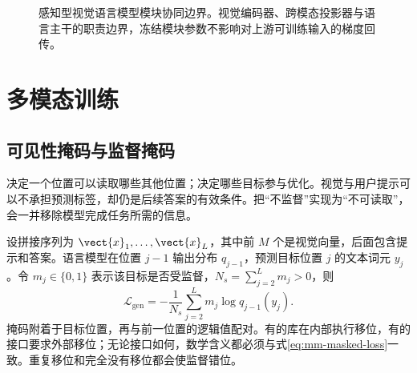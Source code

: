 \documentclass[../textbook.tex]{subfiles}
\begin{document}
\begin{figure}[htbp]
\centering
{}
\caption[感知型视觉语言模型模块协同边界]{感知型视觉语言模型模块协同边界。视觉编码器、跨模态投影器与语言主干的职责边界，冻结模块参数不影响对上游可训练输入的梯度回传。}\label{fig:mm-architecture}
\end{figure}


\section{多模态训练}

\subsection{可见性掩码与监督掩码}
决定一个位置可以读取哪些其他位置；决定哪些目标参与优化。视觉与用户提示可以不承担预测标签，却仍是后续答案的有效条件。把“不监督”实现为“不可读取”，会一并移除模型完成任务所需的信息。

设拼接序列为 $\vect{x}_1,\ldots,\vect{x}_L$，其中前 $M$ 个是视觉向量，后面包含提示和答案。语言模型在位置 $j-1$ 输出分布 $q_{j-1}$，预测目标位置 $j$ 的文本词元 $y_j$。令 $m_j\in\{0,1\}$ 表示该目标是否受监督，$N_s=\sum_{j=2}^Lm_j>0$，则
\begin{equation}
 \mathcal L_{\mathrm{gen}}=-\frac1{N_s}\sum_{j=2}^Lm_j\log q_{j-1}(y_j).
 \label{eq:mm-masked-loss}
\end{equation}
掩码附着于目标位置，再与前一位置的逻辑值配对。有的库在内部执行移位，有的接口要求外部移位；无论接口如何，数学含义都必须与式\ref{eq:mm-masked-loss}一致。重复移位和完全没有移位都会使监督错位。
\end{document}
